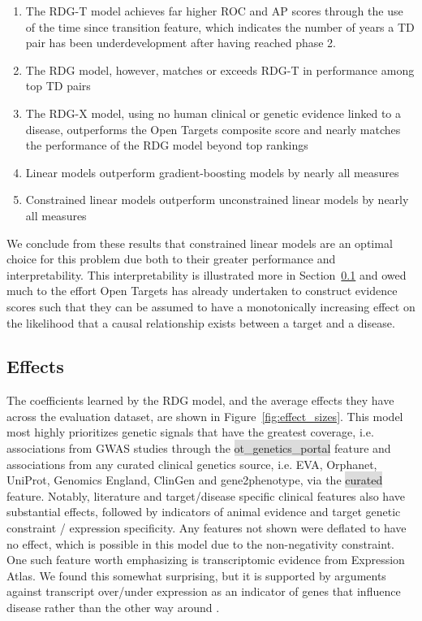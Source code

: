 \documentclass{article}
\begin{document}
\begin{enumerate}
  \item The RDG-T model achieves far higher ROC and AP scores through the use of the time since transition feature, which indicates the number of years a TD pair has been underdevelopment after having reached phase 2.
  \item The RDG model, however, matches or exceeds RDG-T in performance among top TD pairs
  \item The RDG-X model, using no human clinical or genetic evidence linked to a disease, outperforms the Open Targets composite score and nearly matches the performance of the RDG model beyond top rankings
  \item Linear models outperform gradient-boosting models by nearly all measures
  \item Constrained linear models outperform unconstrained linear models by nearly all measures
\end{enumerate}


We conclude from these results that constrained linear models are an optimal choice for this problem due both to their greater performance and interpretability. This interpretability is illustrated more in Section~\ref{sec:effects} and owed much to the effort Open Targets has already undertaken to construct evidence scores such that they can be assumed to have a monotonically increasing effect on the likelihood that a causal relationship exists between a target and a disease.


\subsection{Effects}
\label{sec:effects}

The coefficients learned by the RDG model, and the average effects they have across the evaluation dataset, are shown in Figure~\ref{fig:effect_sizes}. This model most highly prioritizes genetic signals that have the greatest coverage, i.e. associations from GWAS studies through the \colorbox{Gainsboro}{ot\_genetics\_portal} feature and associations from any curated clinical genetics source, i.e. EVA, Orphanet, UniProt, Genomics England, ClinGen and gene2phenotype, via the \colorbox{Gainsboro}{curated} \vspace*{0mm} feature.  Notably, literature and target/disease specific clinical features also have substantial effects, followed by indicators of animal evidence and target genetic constraint / expression specificity. Any features not shown were deflated to have no effect, which is possible in this model due to the non-negativity constraint. One such feature worth emphasizing is transcriptomic evidence from Expression Atlas. We found this somewhat surprising, but it is supported by arguments against transcript over/under expression as an indicator of genes that influence disease rather than the other way around \cite{PMID:34561431}.
\end{document}
